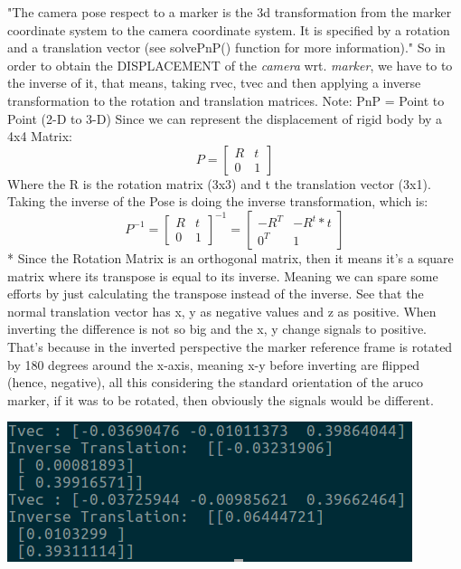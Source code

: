 \documentclass{article}
\begin{document}
"The camera pose respect to a marker is the 3d transformation from the marker coordinate system to the camera coordinate system. It is specified by a rotation and a translation vector (see solvePnP() function for more information)." So in order to obtain the DISPLACEMENT of the \textit{camera} wrt. \textit{marker}, we have to to the inverse of it, that means, taking rvec, tvec and then applying a inverse transformation to the rotation and translation matrices.
Note: PnP = Point to Point (2-D to 3-D)
Since we can represent the displacement of rigid body by a 4x4 Matrix:
\[
P=
  \begin{bmatrix}
    R & t \\
    0 & 1
  \end{bmatrix}
\]
Where the R is the rotation matrix (3x3) and t the translation vector (3x1).
Taking the inverse of the Pose is doing the inverse transformation, which is:
\[
P^{-1}=
  \begin{bmatrix}
    R & t \\
    0 & 1
  \end{bmatrix}^{-1}
  =
  \begin{bmatrix}
  -R^T & -R^t*t \\
  0^T & 1
  \end{bmatrix}
\]
* Since the Rotation Matrix is an orthogonal matrix, then it means it’s a square matrix where its transpose is equal to its inverse. Meaning we can spare some efforts by just calculating the transpose instead of the inverse.
See that the normal translation vector has x, y as negative values and z as positive. When inverting the difference is not so big and the x, y change signals to positive. That's because in the inverted perspective the marker reference frame is rotated by 180 degrees around the x-axis, meaning x-y before inverting are flipped (hence, negative), all this considering the standard orientation of the aruco marker, if it was to be rotated, then obviously the signals would be different.
\begin{center}
  \includegraphics[scale=0.5]{pictures/invertrans.png}
\end{center}
\end{document}
